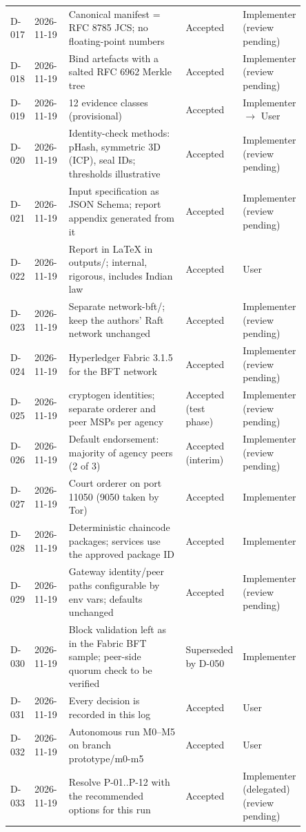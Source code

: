 \begin{longtable}{@{}lp{0.12\linewidth}p{0.47\linewidth}p{0.13\linewidth}p{0.13\linewidth}@{}}
D-017 & 2026-11-19 & Canonical manifest = RFC 8785 JCS; no floating-point numbers & Accepted & Implementer (review pending)\\
D-018 & 2026-11-19 & Bind artefacts with a salted RFC 6962 Merkle tree & Accepted & Implementer (review pending)\\
D-019 & 2026-11-19 & 12 evidence classes (provisional) & Accepted & Implementer $\rightarrow$ User\\
D-020 & 2026-11-19 & Identity-check methods: pHash, symmetric 3D (ICP), seal IDs; thresholds illustrative & Accepted & Implementer (review pending)\\
D-021 & 2026-11-19 & Input specification as JSON Schema; report appendix generated from it & Accepted & Implementer (review pending)\\
D-022 & 2026-11-19 & Report in LaTeX in outputs/; internal, rigorous, includes Indian law & Accepted & User\\
D-023 & 2026-11-19 & Separate network-bft/; keep the authors' Raft network unchanged & Accepted & Implementer (review pending)\\
D-024 & 2026-11-19 & Hyperledger Fabric 3.1.5 for the BFT network & Accepted & Implementer (review pending)\\
D-025 & 2026-11-19 & cryptogen identities; separate orderer and peer MSPs per agency & Accepted (test phase) & Implementer (review pending)\\
D-026 & 2026-11-19 & Default endorsement: majority of agency peers (2 of 3) & Accepted (interim) & Implementer (review pending)\\
D-027 & 2026-11-19 & Court orderer on port 11050 (9050 taken by Tor) & Accepted & Implementer\\
D-028 & 2026-11-19 & Deterministic chaincode packages; services use the approved package ID & Accepted & Implementer\\
D-029 & 2026-11-19 & Gateway identity/peer paths configurable by env vars; defaults unchanged & Accepted & Implementer (review pending)\\
D-030 & 2026-11-19 & Block validation left as in the Fabric BFT sample; peer-side quorum check to be verified & Superseded by D-050 & Implementer\\
D-031 & 2026-11-19 & Every decision is recorded in this log & Accepted & User\\
D-032 & 2026-11-19 & Autonomous run M0–M5 on branch prototype/m0-m5 & Accepted & User\\
D-033 & 2026-11-19 & Resolve P-01..P-12 with the recommended options for this run & Accepted & Implementer (delegated) (review pending)\\

\end{longtable}
